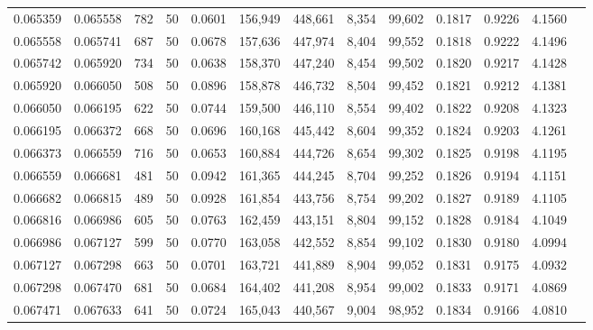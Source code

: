 \begin{tabular}{rrrrrrrrrrrrr}
0.065359 & 0.065558 &   782 &  50 &                                     0.0601 & 156,949 & 448,661 &   8,354 &  99,602 & 0.1817 & 0.9226 & 4.1560 \\
0.065558 & 0.065741 &   687 &  50 &                                     0.0678 & 157,636 & 447,974 &   8,404 &  99,552 & 0.1818 & 0.9222 & 4.1496 \\
0.065742 & 0.065920 &   734 &  50 &                                     0.0638 & 158,370 & 447,240 &   8,454 &  99,502 & 0.1820 & 0.9217 & 4.1428 \\
0.065920 & 0.066050 &   508 &  50 &                                     0.0896 & 158,878 & 446,732 &   8,504 &  99,452 & 0.1821 & 0.9212 & 4.1381 \\
0.066050 & 0.066195 &   622 &  50 &                                     0.0744 & 159,500 & 446,110 &   8,554 &  99,402 & 0.1822 & 0.9208 & 4.1323 \\
0.066195 & 0.066372 &   668 &  50 &                                     0.0696 & 160,168 & 445,442 &   8,604 &  99,352 & 0.1824 & 0.9203 & 4.1261 \\
0.066373 & 0.066559 &   716 &  50 &                                     0.0653 & 160,884 & 444,726 &   8,654 &  99,302 & 0.1825 & 0.9198 & 4.1195 \\
0.066559 & 0.066681 &   481 &  50 &                                     0.0942 & 161,365 & 444,245 &   8,704 &  99,252 & 0.1826 & 0.9194 & 4.1151 \\
0.066682 & 0.066815 &   489 &  50 &                                     0.0928 & 161,854 & 443,756 &   8,754 &  99,202 & 0.1827 & 0.9189 & 4.1105 \\
0.066816 & 0.066986 &   605 &  50 &                                     0.0763 & 162,459 & 443,151 &   8,804 &  99,152 & 0.1828 & 0.9184 & 4.1049 \\
0.066986 & 0.067127 &   599 &  50 &                                     0.0770 & 163,058 & 442,552 &   8,854 &  99,102 & 0.1830 & 0.9180 & 4.0994 \\
0.067127 & 0.067298 &   663 &  50 &                                     0.0701 & 163,721 & 441,889 &   8,904 &  99,052 & 0.1831 & 0.9175 & 4.0932 \\
0.067298 & 0.067470 &   681 &  50 &                                     0.0684 & 164,402 & 441,208 &   8,954 &  99,002 & 0.1833 & 0.9171 & 4.0869 \\
0.067471 & 0.067633 &   641 &  50 &                                     0.0724 & 165,043 & 440,567 &   9,004 &  98,952 & 0.1834 & 0.9166 & 4.0810 \\

\end{tabular}
